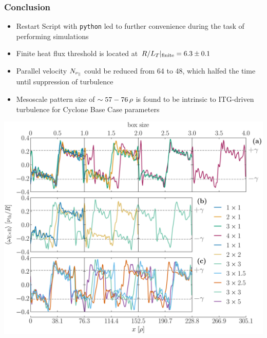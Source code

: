 \documentclass[compress,aspectratio=1610,noflama]{beamer}
\begin{document}
	\begin{frame}
		\frametitle{Conclusion}
		
		\begin{minipage}{0.4\paperwidth}\raggedleft
			\begin{itemize}
				\item <2-> Restart Script with \texttt{python} led to further convenience during the task of performing simulations
				\item <3-> Finite heat flux threshold is located at $R/L_T|_\mathrm{finite} = 6.3 \pm 0.1$
				\item <4-> Parallel velocity $N_{\nu_\parallel}$ could be reduced from 64 to 48, which halfed the time until suppression of turbulence
				\item <5-> Mesoscale pattern size of $\sim 57 - 76\,\rho$ is found to be intrinsic to ITG-driven turbulence for Cyclone Base Case parameters
			\end{itemize}
		\end{minipage}
		\begin{minipage}{0.4\paperwidth}
			 \includegraphics[width = 0.5\paperwidth]{Comparison/Boxsize/S6_rlt6.0_boxsize1-2-3-4x1-1.5-2-2.5-3-5_Ns16_Nvpar48_Nmu9_wexb_comparison_thesis.pdf}
		\end{minipage}
	\end{frame}

\end{document}
